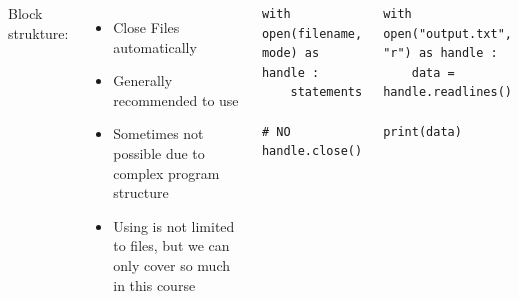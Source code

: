 \begin{frame}[fragile]
%
\begin{columns}[T]
\begin{Large}
	{Block strukture: }
\end{Large}
\vspace{12pt}
\begin{itemize}
\item Close Files automatically
\item Generally recommended to use
\item Sometimes not possible due to complex program structure
\item Using  is not limited to files, but we can only cover so much in this course
\end{itemize}
%
\begin{codebox}
\begin{verbatim}
with open(filename, mode) as handle :
    statements

# NO handle.close()
\end{verbatim}
\end{codebox}
%
\begin{codebox}
\begin{verbatim}
with open("output.txt", "r") as handle :
    data = handle.readlines()
    
print(data)
\end{verbatim}
\end{codebox}
%
\end{columns}
%
\end{frame}


